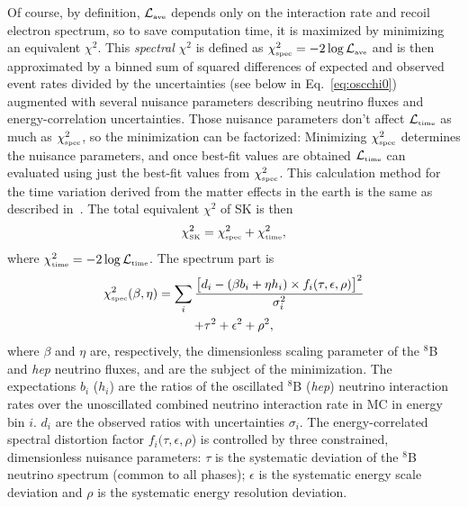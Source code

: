 \documentclass[aps,prd,reprint,superscriptaddress,floatfix,altaffilletter,nofootinbib]{revtex4-2}
\begin{document}
Of course, by definition, $\mathcal{L}_{\mbox{\tiny ave}}$ depends only on the interaction rate and recoil electron spectrum, so to save computation time, it is maximized by minimizing an equivalent 
$\chi^2$. This \emph{spectral} $\chi^2$ is defined as $\chi^2_{\mbox{\tiny spec}}=-2\log \mathcal{L}_{\mbox{\tiny ave}}$ and is then approximated by a binned sum of squared differences of expected and observed event rates divided by the uncertainties (see below in Eq.~\ref{eq:oscchi0}) augmented with several nuisance parameters describing neutrino fluxes and energy-correlation uncertainties. Those nuisance parameters don't affect $\mathcal{L}_{\mbox{\tiny time}}$ as much as $\chi^2_{\mbox{\tiny spec}}$, so the minimization can be factorized: Minimizing $\chi^2_{\mbox{\tiny spec}}$ determines the nuisance parameters, and once best-fit values are obtained 
$\mathcal{L}_{\mbox{\tiny time}}$ can evaluated using just the best-fit values from $\chi^2_{\mbox{\tiny spec}}$. 
This calculation method for the time variation derived from the matter effects in the earth is the same as described in~\cite{Smy:2003jf, Hosaka:2005um}.
The total
equivalent $\chi^2$ of SK is then
\begin{equation}
     \chi^2_{\mbox{\tiny SK}} = \chi^2_{\mbox{\tiny spec}} + \chi^2_{\mbox{\tiny time}},
\label{eq:chi2_all}
\end{equation}
where $\chi^2_{\mbox{\tiny time}}=-2\log \mathcal{L}_{\mbox{\tiny time}}$.
The spectrum part is
\begin{multline}
     \chi^{2}_{\mbox{\tiny spec}}(\beta, \eta)= \sum_i \frac{\big[d_i - (\beta b_i + \eta h_i)\times 
     f_i(\tau, \epsilon, \rho)
     \big]^2}{\sigma^2_i}
 \\ + \tau^2 + \epsilon^2 +  \rho^2,
     \label{eq:oscchi0}
\end{multline}
where $\beta$ and $\eta$ are, respectively, the dimensionless scaling parameter of the $^8$B  and {\it hep} neutrino fluxes, and are the subject of the minimization. The expectations $b_i$ ($h_i$) are the ratios of the oscillated $^8$B ({\it hep}) neutrino interaction rates over the unoscillated combined neutrino interaction rate in MC in energy bin $i$. $d_i$ are the observed ratios with uncertainties $\sigma_i$. The energy-correlated spectral distortion factor $f_i(\tau, \epsilon, \rho$) is controlled by three constrained, dimensionless nuisance parameters: $\tau$ is the systematic deviation of the $^8$B neutrino spectrum (common to all phases); $\epsilon$ is the systematic energy scale deviation and $\rho$ is the systematic energy resolution deviation.
\end{document}
